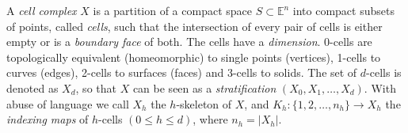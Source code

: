 \documentclass[]{egpubl}
\def\E{\mathbb{E}}
\begin{document}
A \emph{cell complex} $X$ is a partition of a compact space $S \subset \E^n$ into compact subsets of points, called \emph{cells}, such that the intersection of every pair of cells is either empty or is a \emph{boundary face} of both. The cells have a \emph{dimension}. 0-cells are topologically equivalent (homeomorphic) to single points (vertices), 1-cells to curves (edges), 2-cells to surfaces (faces) and 3-cells to solids.  The set of $d$-cells is denoted as $X_d$, so that $X$ can be seen as a \emph{stratification} $(X_0, X_1, \ldots, X_d)$. With abuse of language we call $X_h$ the $h$-skeleton of $X$, and $K_h: \{1,2,\ldots,n_h\} \to X_h$ the \emph{indexing maps} of $h$-cells $(0\leq h\leq d)$, where $n_h=|X_h|$. 


\end{document}

